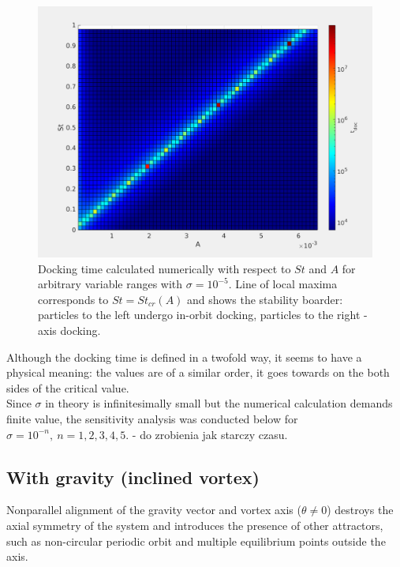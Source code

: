 \documentclass[../main.tex]{subfiles}
\begin{document}
\begin{figure}
\centering
\noindent \includegraphics[width=30pc]{gfx/surf_logtdoc_vs_A_vs_St_full.png}
\caption{Docking time calculated numerically with respect to $St$ and $A$ for arbitrary variable ranges with $\sigma=10^{-5}$. Line of local maxima corresponds to $St=St_{cr}(A)$ and shows the stability boarder: particles to the left undergo in-orbit docking, particles to the right - axis docking.}
\label{fig:ch3_4}
\end{figure}

Although the docking time is defined in a twofold way, it seems to have a physical meaning: the values are of a similar order, it goes towards on the both sides of the critical value.\\
Since $\sigma$ in theory is infinitesimally small but the numerical calculation demands finite value, the sensitivity analysis was conducted below for $\sigma=10^{-n}, \ n=1,2,3,4,5$. - do zrobienia jak starczy czasu.\\


\subsection{With gravity (inclined vortex)}
\label{ch3s2ss2}
\noindent Nonparallel alignment of the gravity vector and vortex axis ($\theta \neq 0$) destroys the axial symmetry of the system and introduces the presence of other attractors, such as non-circular periodic orbit and multiple equilibrium points outside the axis.\\
 
\end{document}
